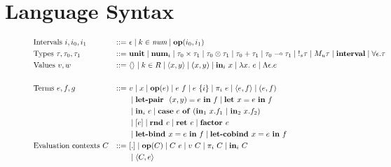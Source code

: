 \section{Language Syntax}

\begin{figure}[tbp]
  \begin{alignat*}{3}
         &\text{Intervals } i, i_0, i_1 &::=~ &\epsilon
         \mid k \in \textit{num}
         \mid \mathbf{op}(i_0, i_1) \\
         &\text{Types } \tau, \tau_0, \tau_1 &::=~ &\mathbf{unit}
         \mid \num_{i}
         \mid \tau_0 \times \tau_1
         \mid \tau_0 \otimes \tau_1
         \mid \tau_0 + \tau_1
         \mid \tau_0 \multimap \tau_1
         \mid {\bang{s} \tau}
         \mid {M_u \tau}
         \mid \textbf{interval}
         \mid \forall \epsilon . \tau
         \\
         &\text{Values } v, w \ &::=~ &\langle \rangle
         \mid k \in R
         \mid \langle x,y \rangle 
         \mid (x, y)
         \mid \tin_i \ x
         \mid \lambda x.~e
         \mid \Lambda \epsilon . e \\
         \\
         &\text{Terms } e, f, g &::=~ &v
         \mid x
         \mid \mathbf{op}(e)
         \mid e~f
         \mid e~\{i\}
         \mid {\pi}_i\ e
         \mid \langle e,f \rangle 
         \mid (e, f) \\
         & & & \mid \letpair \ (x,y) = e \ \tin \ f
         \mid \letassign x  = e \ \tin \ f \\
         & & & \mid \tin_i \ e
         \mid 
          \mathbf{case} \ e \ \mathbf{of} \ (\tin_1 \ x.f_1 \ | \ \tin_2 \ x.f_2) \\
         & & &
         \mid [e]
         \mid \rnd e
         \mid {\ret e} 
         \mid \factor e \\
         & & & 
         \mid {\letbind x = e \ \tin \ f}
         \mid \letcobind x = e \ \tin \ f
         \\
         &\text{Evaluation contexts } C &::=~ &[.] 
         \mid \mathbf{op}(C) 
         \mid C~e 
         \mid v~C 
         \mid \pi_i~C 
         \mid \mathbf{in}_i~C \\
         & & &
         \mid \langle C, e \rangle

\end{alignat*}
\end{figure}
